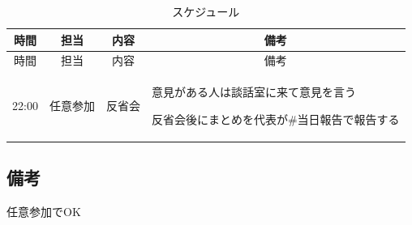 \begin{longtable}[c]{|p{}|p{}|p{}|p{}|}
  \caption{スケジュール} \\
  \hline
  \multicolumn{1}{|c|}{時間} & \multicolumn{1}{c|}{担当} & \multicolumn{1}{c|}{内容} & \multicolumn{1}{c|}{備考} \\
  \hline
  \endfirsthead
  
  \hline
  \multicolumn{1}{|c|}{時間} & \multicolumn{1}{c|}{担当} & \multicolumn{1}{c|}{内容} & \multicolumn{1}{c|}{備考} \\
  \hline
  \endhead
  
  \hline
  \endfoot
  
  \hline
  \endlastfoot
  
  \begin{tpacol}
    22:00
  \end{tpacol}&
  \begin{tpbcol}
    任意参加
  \end{tpbcol}&
  \begin{tpccol}
    反省会
  \end{tpccol}&
  \begin{tpdcol}
    意見がある人は談話室に来て意見を言う \par
    反省会後にまとめを代表が\#当日報告で報告する
  \end{tpdcol}\\

\end{longtable}
\normalsize

\subsection{備考}
任意参加でOK
